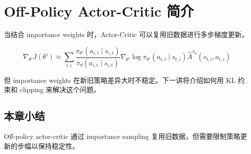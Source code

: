 \section{Off-Policy Actor-Critic 简介}

当结合 importance weights 时，Actor-Critic 可以复用旧数据进行多步梯度更新。

$$\nabla_{\theta'} J(\theta') \approx \sum_{t,i} \frac{\pi_{\theta'}(a_{i,t} \mid s_{i,t})}{\pi_\theta(a_{i,t} \mid s_{i,t})} \nabla_{\theta'} \log \pi_{\theta'}(a_{t,i} \mid s_{t,i}) \hat{A}^{\pi_\theta}(s_{t,i}, a_{t,i})$$

但 importance weights 在新旧策略差异大时不稳定。下一讲将介绍如何用 KL 约束和 clipping 来解决这个问题。

\subsection{本章小结}

Off-policy actor-critic 通过 importance sampling 复用旧数据，但需要限制策略更新的步幅以保持稳定性。

